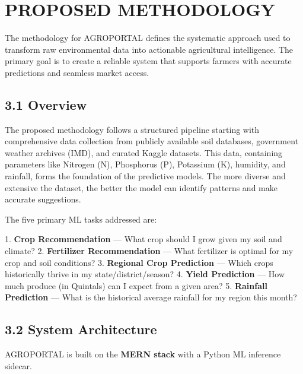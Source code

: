 \documentclass[12pt,a4paper]{report}
\begin{document}
\newpage

\chapter{PROPOSED METHODOLOGY}

The methodology for AGROPORTAL defines the systematic approach used to transform raw environmental data into actionable agricultural intelligence. The primary goal is to create a reliable system that supports farmers with accurate predictions and seamless market access.

\section{3.1 Overview}

The proposed methodology follows a structured pipeline starting with comprehensive data collection from publicly available soil databases, government weather archives (IMD), and curated Kaggle datasets. This data, containing parameters like Nitrogen (N), Phosphorus (P), Potassium (K), humidity, and rainfall, forms the foundation of the predictive models. The more diverse and extensive the dataset, the better the model can identify patterns and make accurate suggestions.

The five primary ML tasks addressed are:

1. \textbf{Crop Recommendation} — What crop should I grow given my soil and climate?
2. \textbf{Fertilizer Recommendation} — What fertilizer is optimal for my crop and soil conditions?
3. \textbf{Regional Crop Prediction} — Which crops historically thrive in my state/district/season?
4. \textbf{Yield Prediction} — How much produce (in Quintals) can I expect from a given area?
5. \textbf{Rainfall Prediction} — What is the historical average rainfall for my region this month?

\section{3.2 System Architecture}

AGROPORTAL is built on the \textbf{MERN stack} with a Python ML inference sidecar.
\end{document}

